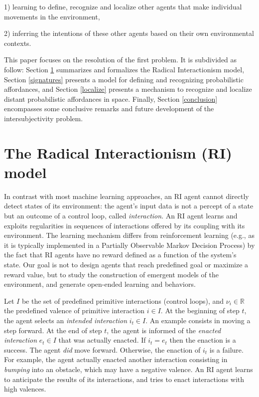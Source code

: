 \documentclass[conference]{IEEEtran}
\begin{document}
1) learning to define, recognize and localize other agents that make individual movements in the environment,

2) inferring the intentions of these other agents based on their own environmental contexts. %

This paper focuses on the resolution of the first problem. 
It is subdivided as follow: Section \ref{RI} summarizes and formalizes the Radical Interactionism model, Section \ref{signatures} presents a model for defining and recognizing probabilistic affordances, and Section \ref{localize} presents a mechanism to recognize and localize distant probabilistic affordances in space. Finally, Section \ref{conclusion} encompasses some conclusive remarks and future development of the intersubjectivity problem.

\section{The Radical Interactionism (RI) model}\label{RI}


In contrast with most machine learning approaches, an RI agent cannot directly detect states of its environment: %
the agent's input data is not a percept of a state but an outcome of a control loop, called \textit{interaction}.
An RI agent learns and exploits regularities in sequences of interactions offered by its coupling with its environment.
The learning mechanism differs from reinforcement learning (e.g., as it is typically implemented in a Partially Observable Markov Decision Process) by the fact that RI agents have no reward defined as a function of the system's state.
Our goal is not to design agents that reach predefined goal or maximize a reward value, but to study the construction of emergent models of the environment, and generate open-ended learning and behaviors.

Let $I$ be the set of predefined primitive interactions (control loops), and $\nu_i \in \mathbb{R}$ the predefined valence of primitive interaction $i \in I$.
At the beginning of step $t$, the agent selects an \textit{intended interaction} $i_t \in I$.
An example consists in moving a step forward. %
At the end of step $t$, the agent is informed of the \textit{enacted interaction} $e_t \in I$ that was actually enacted. 
If $i_t = e_t$ then the enaction is a success. 
The agent \textit{did} move forward.
Otherwise, the enaction of $i_t$ is a failure.
For example, the agent actually enacted another interaction consisting in \textit{bumping} into an obstacle, which may have a negative valence.
An RI agent learns to anticipate the results of its interactions, and tries to enact interactions with high valences.
\end{document}
